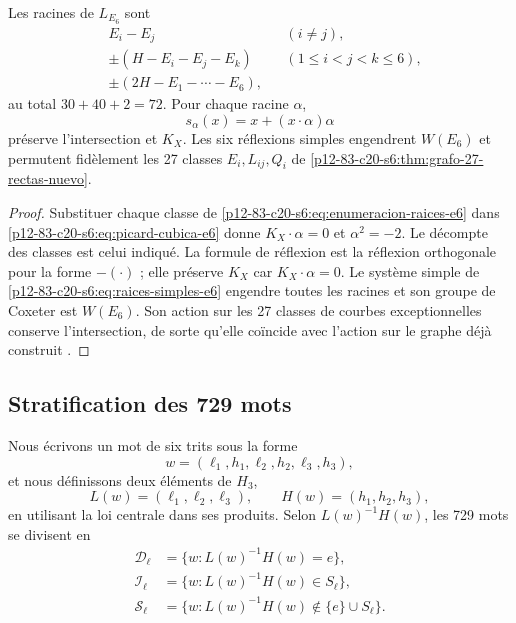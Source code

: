\begin{proposition}
\label{p12-83-c20-s6:prop:setenta-dos-raices-e6}
Les racines de \(L_{E_6}\) sont
\begin{equation}
 \begin{aligned}
 &E_i-E_j &&(i\ne j),\\
 &\pm(H-E_i-E_j-E_k) &&(1\le i<j<k\le6),\\
 &\pm(2H-E_1-\cdots-E_6),
 \end{aligned}
 \label{p12-83-c20-s6:eq:enumeracion-raices-e6}
\end{equation}
au total \(30+40+2=72\). Pour chaque racine \(\alpha\),
\begin{equation}
 s_\alpha(x)=x+(x\cdot\alpha)\alpha
 \label{p12-83-c20-s6:eq:reflexion-raiz-e6}
\end{equation}
préserve l’intersection et \(K_X\). Les six réflexions simples engendrent
\(W(E_6)\) et permutent fidèlement les 27 classes
\(E_i,L_{ij},Q_i\) de \cref{p12-83-c20-s6:thm:grafo-27-rectas-nuevo}.
\end{proposition}

\begin{proof}
Substituer chaque classe de \cref{p12-83-c20-s6:eq:enumeracion-raices-e6} dans \cref{p12-83-c20-s6:eq:picard-cubica-e6} donne \(K_X\cdot\alpha=0\) et \(\alpha^2=-2\). Le décompte des classes est celui indiqué. La formule de réflexion est la réflexion orthogonale pour la forme \(-(\cdot)\) ; elle préserve \(K_X\) car \(K_X\cdot\alpha=0\). Le système simple de \cref{p12-83-c20-s6:eq:raices-simples-e6} engendre toutes les racines et son groupe de Coxeter est \(W(E_6)\). Son action sur les 27 classes de courbes exceptionnelles conserve l'intersection, de sorte qu'elle coïncide avec l'action sur le graphe déjà construit \cite{Manivel2005}.
\end{proof}

\subsection{Stratification des 729 mots}

Nous écrivons un mot de six trits sous la forme
\[
 w=(\ell_1,h_1,\ell_2,h_2,\ell_3,h_3),
\]
et nous définissons deux éléments de \(H_3\),
\[
 L(w)=(\ell_1,\ell_2,\ell_3),\qquad
 H(w)=(h_1,h_2,h_3),
\]
en utilisant la loi centrale dans ses produits. Selon
\(L(w)^{-1}H(w)\), les 729 mots se divisent en
\begin{align*}
 \mathcal D_\ell&=\{w:L(w)^{-1}H(w)=e\},\\
 \mathcal I_\ell&=\{w:L(w)^{-1}H(w)\in S_\ell\},\\
 \mathcal S_\ell&=\{w:L(w)^{-1}H(w)\notin\{e\}\cup S_\ell\}.
\end{align*}

